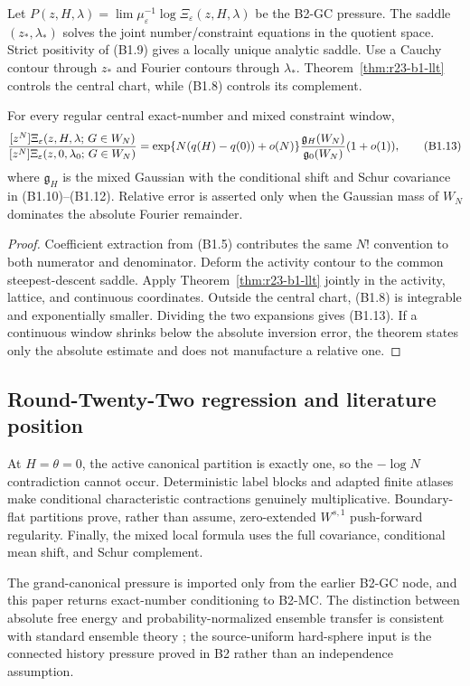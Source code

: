Let $P(z,H,\lambda)=\lim\mu_\varepsilon^{-1}\log
\Xi_\varepsilon(z,H,\lambda)$ be the B2-GC pressure.  The saddle
$(z_*,\lambda_*)$ solves the joint number/constraint equations in the quotient
space.  Strict positivity of (B1.9) gives a locally unique analytic saddle.
Use a Cauchy contour through $z_*$ and Fourier contours through
$\lambda_*$.  Theorem~\ref{thm:r23-b1-llt} controls the central chart, while
(B1.8) controls its complement.

\begin{theorem}
\label{thm:r23-b1-extraction}
For every regular central exact-number and mixed constraint window,
\[
 { [z^N]\Xi_\varepsilon(z,H,\lambda;\,G\in W_N)
  \over
   [z^N]\Xi_\varepsilon(z,0,\lambda_0;\,G\in W_N)}
 =\exp\{N(q(H)-q(0))+o(N)\}
 {\mathfrak g_H(W_N)\over\mathfrak g_0(W_N)}(1+o(1)),    \tag{B1.13}
\]
where $\mathfrak g_H$ is the mixed Gaussian with the conditional shift and
Schur covariance in (B1.10)--(B1.12).  Relative error is asserted only when
the Gaussian mass of $W_N$ dominates the absolute Fourier remainder.
\end{theorem}

\begin{proof}
Coefficient extraction from (B1.5) contributes the same $N!$ convention to
both numerator and denominator.  Deform the activity contour to the common
steepest-descent saddle.  Apply Theorem~\ref{thm:r23-b1-llt} jointly in the
activity, lattice, and continuous coordinates.  Outside the central chart,
(B1.8) is integrable and exponentially smaller.  Dividing the two expansions
gives (B1.13).  If a continuous window shrinks below the absolute inversion
error, the theorem states only the absolute estimate and does not manufacture
a relative one.
\end{proof}

\subsection{Round-Twenty-Two regression and literature position}

At $H=\theta=0$, the active canonical partition is exactly one, so the
$-\log N$ contradiction cannot occur.  Deterministic label blocks and adapted
finite atlases make conditional characteristic contractions genuinely
multiplicative.  Boundary-flat partitions prove, rather than assume,
zero-extended $W^{s,1}$ push-forward regularity.  Finally, the mixed local
formula uses the full covariance, conditional mean shift, and Schur
complement.

The grand-canonical pressure is imported only from the earlier B2-GC node, and
this paper returns exact-number conditioning to B2-MC.  The distinction between
absolute free energy and probability-normalized ensemble transfer is consistent
with standard ensemble theory \cite{Touchette2015}; the source-uniform
hard-sphere input is the connected history pressure proved in B2 rather than an
independence assumption.
